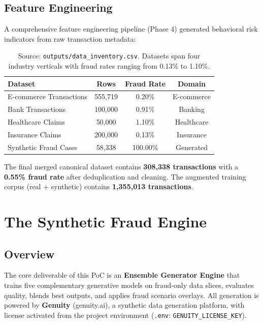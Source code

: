 \documentclass[12pt,a4paper,oneside]{book}
\begin{document}
\section{Feature Engineering}

A comprehensive feature engineering pipeline (Phase 4) generated behavioral risk indicators from raw transaction metadata:

\begin{table}[H]
    \centering
    \caption{Dataset Inventory -- Source Domains, Volume, and Fraud Prevalence}
    \label{tab:datasets}
    \begin{tabular}{l c c c}
        \toprule
        \textbf{Dataset} & \textbf{Rows} & \textbf{Fraud Rate} & \textbf{Domain} \\ \midrule
        E-commerce Transactions & 555,719 & 0.20\% & E-commerce \\
        Bank Transactions & 100,000 & 0.91\% & Banking \\
        Healthcare Claims & 50,000 & 1.10\% & Healthcare \\
        Insurance Claims & 200,000 & 0.13\% & Insurance \\
        Synthetic Fraud Cases & 58,338 & 100.00\% & Generated \\
        \bottomrule
    \end{tabular}
    \caption*{Source: \texttt{outputs/data\_inventory.csv}. Datasets span four industry verticals with fraud rates ranging from 0.13\% to 1.10\%.}
\end{table}

The final merged canonical dataset contains \textbf{308,338 transactions} with a \textbf{0.55\% fraud rate} after deduplication and cleaning. The augmented training corpus (real + synthetic) contains \textbf{1,355,013 transactions}.

\clearpage

\chapter{The Synthetic Fraud Engine}
\label{sec:synthetic_engine}
\thispagestyle{fancy}

\section{Overview}

The core deliverable of this PoC is an \textbf{Ensemble Generator Engine} that trains five complementary generative models on fraud-only data slices, evaluates quality, blends best outputs, and applies fraud scenario overlays. All generation is powered by \textbf{Genuity} (genuity.ai), a synthetic data generation platform, with license activated from the project environment (\texttt{.env}: \texttt{GENUITY\_LICENSE\_KEY}).
\end{document}
